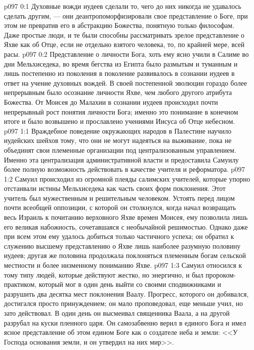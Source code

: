 \vs p097 0:1 Духовные вожди иудеев сделали то, чего до них никогда не удавалось сделать другим, --- они деантропоморфизировали свое представление о Боге, при этом не превратив его в абстракцию Божества, понятную только философам. Даже простые люди, и те были способны рассматривать зрелое представление о Яхве как об Отце, если не отдельно взятого человека, то, по крайней мере, всей расы.
\vs p097 0:2 Представление о личности Бога, хоть ему ясно учили в Салиме во дни Мельхиседека, во время бегства из Египта было размытым и туманным и лишь постепенно из поколения в поколение развивалось в сознании иудеев в ответ на учение духовных вождей. В своей постепенной эволюции гораздо более непрерывным было осознание личности Яхве, чем любого другого атрибута Божества. От Моисея до Малахии в сознании иудеев происходил почти непрерывный рост понятия личности Бога; именно это понимание в конечном итоге и было возвышено и прославлено учениями Иисуса об Отце небесном.
\vs p097 1:1 Враждебное поведение окружающих народов в Палестине научило иудейских шейхов тому, что они не могут надеяться на выживание, пока не объединят свои племенные организации под централизованным управлением. Именно эта централизация административной власти и предоставила Самуилу более полную возможность действовать в качестве учителя и реформатора.
\vs p097 1:2 Самуил происходил из огромной плеяды салимских учителей, которые упорно отстаивали истины Мельхиседека как часть своих форм поклонения. Этот учитель был мужественным и решительным человеком. Устоять перед лицом почти всеобщей оппозиции, с которой он столкнулся, когда начал возвращать весь Израиль к почитанию верховного Яхве времен Моисея, ему позволила лишь его великая набожность, сочетавшаяся с необычайной решимостью. Однако даже при всем этом ему удалось добиться только частичного успеха; он обратил к служению высшему представлению о Яхве лишь наиболее разумную половину иудеев; другая же половина продолжала поклоняться племенным богам сельской местности и более низменному пониманию Яхве.
\vs p097 1:3 Самуил относился к тому типу людей, которые действуют жестко, но энергично, и был пророком\hyp{}практиком, который мог в один день выйти со своими сподвижниками и разрушить два десятка мест поклонения Ваалу. Прогресс, которого он добивался, достигался просто принуждением; он мало проповедовал, еще меньше учил, но зато действовал. В один день он высмеивал священника Ваала, а на другой разрубал на куски пленного царя. Он самозабвенно верил в единого Бога и имел ясное представление об этом едином Боге как о создателе неба и земли: <<У Господа основания земли, и он утвердил на них мир>>.
